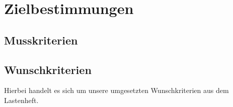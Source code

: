 \section{Zielbestimmungen}
\subsection{Musskriterien}
\subsection{Wunschkriterien}
    Hierbei handelt es sich um unsere umgesetzten Wunschkriterien aus dem Lastenheft. 
    